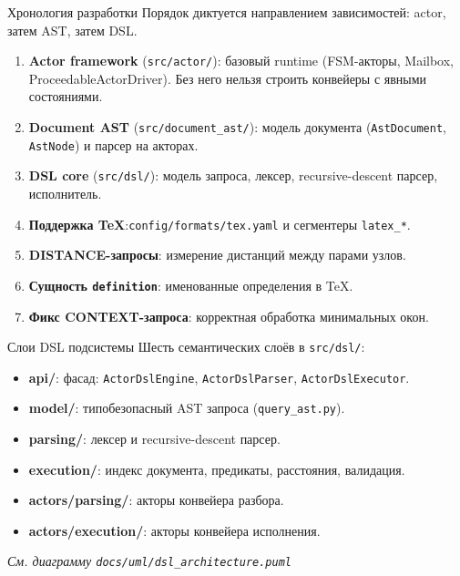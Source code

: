 \documentclass[aspectratio=169,11pt]{beamer}
\newcommand{\uml}[1]{\textit{См. диаграмму \texttt{docs/uml/#1}}}
\begin{document}
\begin{frame}{Хронология разработки}
  Порядок диктуется направлением зависимостей: actor, затем AST, затем DSL.
  \begin{enumerate}
    \item \textbf{Actor framework} (\texttt{src/actor/}): базовый runtime
          (FSM-акторы, Mailbox, ProceedableActorDriver). Без него нельзя строить
          конвейеры с явными состояниями.
    \item \textbf{Document AST} (\texttt{src/document\_ast/}): модель документа
          (\texttt{AstDocument}, \texttt{AstNode}) и парсер на акторах.
    \item \textbf{DSL core} (\texttt{src/dsl/}): модель запроса, лексер,
          recursive-descent парсер, исполнитель.
    \item \textbf{Поддержка TeX}:\texttt{config/formats/tex.yaml} и сегментеры
          \texttt{latex\_*}.
    \item \textbf{DISTANCE-запросы}: измерение дистанций между парами узлов.
    \item \textbf{Сущность \texttt{definition}}: именованные определения в TeX.
    \item \textbf{Фикс CONTEXT-запроса}: корректная обработка минимальных окон.
  \end{enumerate}
\end{frame}

\begin{frame}{Слои DSL подсистемы}
  Шесть семантических слоёв в \texttt{src/dsl/}:
  \begin{itemize}
    \item \textbf{api/}: фасад: \texttt{ActorDslEngine}, \texttt{ActorDslParser},
          \texttt{ActorDslExecutor}.
    \item \textbf{model/}: типобезопасный AST запроса (\texttt{query\_ast.py}).
    \item \textbf{parsing/}: лексер и recursive-descent парсер.
    \item \textbf{execution/}: индекс документа, предикаты, расстояния, валидация.
    \item \textbf{actors/parsing/}: акторы конвейера разбора.
    \item \textbf{actors/execution/}: акторы конвейера исполнения.
  \end{itemize}
  \vspace{0.3em}
  \uml{dsl\_architecture.puml}
\end{frame}

\end{document}
